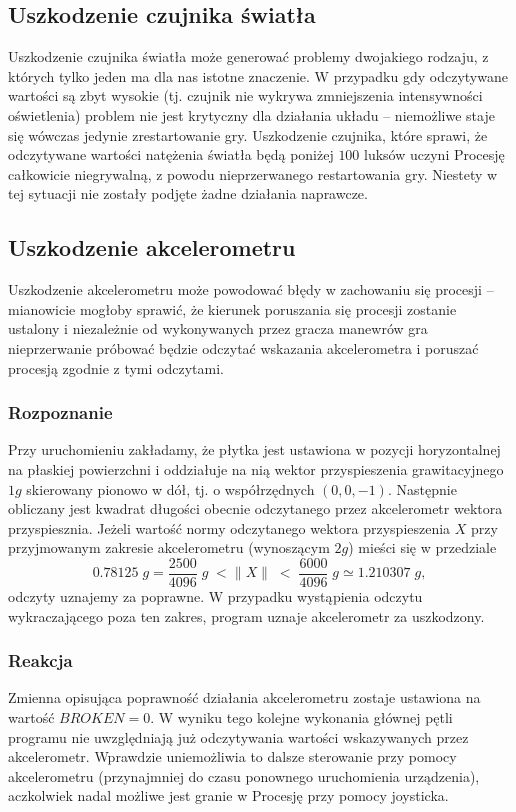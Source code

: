 \documentclass[a4paper,12pt,twoside]{article}
\theoremstyle{plain}
\theoremstyle{definition}
\theoremstyle{remark}
\begin{document}
	\subsection{Uszkodzenie czujnika światła}
	Uszkodzenie czujnika światła może generować problemy dwojakiego rodzaju, z których tylko jeden ma dla nas istotne znaczenie. W przypadku gdy odczytywane wartości są zbyt wysokie (tj. czujnik nie wykrywa zmniejszenia intensywności oświetlenia) problem nie jest krytyczny dla działania układu -- niemożliwe staje się wówczas jedynie zrestartowanie gry. Uszkodzenie czujnika, które sprawi, że odczytywane wartości natężenia światła będą poniżej $100$ luksów uczyni Procesję całkowicie niegrywalną, z powodu nieprzerwanego restartowania gry. Niestety w tej sytuacji nie zostały podjęte żadne działania naprawcze.
		
	\subsection{Uszkodzenie akcelerometru}
	Uszkodzenie akcelerometru może powodować błędy w zachowaniu się procesji -- mianowicie mogłoby sprawić, że kierunek poruszania się procesji zostanie ustalony i niezależnie od wykonywanych przez gracza manewrów gra nieprzerwanie próbować będzie odczytać wskazania akcelerometra i poruszać procesją zgodnie z tymi odczytami.
	\subsubsection{Rozpoznanie}
	Przy uruchomieniu zakładamy, że płytka jest ustawiona w pozycji horyzontalnej na płaskiej powierzchni i oddziałuje na nią wektor przyspieszenia grawitacyjnego $1g$ skierowany pionowo w dół, tj. o współrzędnych $(0,0,-1)$. Następnie obliczany jest kwadrat długości obecnie odczytanego przez akcelerometr wektora przyspiesznia. Jeżeli wartość normy odczytanego wektora przyspieszenia $X$ przy przyjmowanym zakresie akcelerometru (wynoszącym $2g$) mieści się w przedziale
	$$0.78125\;g = \frac{2500}{4096}\; g \; < \| X \| \; < \; \frac{6000}{4096}\; g \simeq 1.210307\; g ,$$
	odczyty uznajemy za poprawne. W przypadku wystąpienia odczytu wykraczającego poza ten zakres, program uznaje akcelerometr za uszkodzony.
	\subsubsection{Reakcja}
	Zmienna opisująca poprawność działania akcelerometru zostaje ustawiona na wartość $BROKEN = 0$. W wyniku tego kolejne wykonania głównej pętli programu nie uwzględniają już odczytywania wartości wskazywanych przez akcelerometr. Wprawdzie uniemożliwia to dalsze sterowanie przy pomocy akcelerometru (przynajmniej do czasu ponownego uruchomienia urządzenia), aczkolwiek nadal możliwe jest granie w Procesję przy pomocy joysticka.
\end{document}

